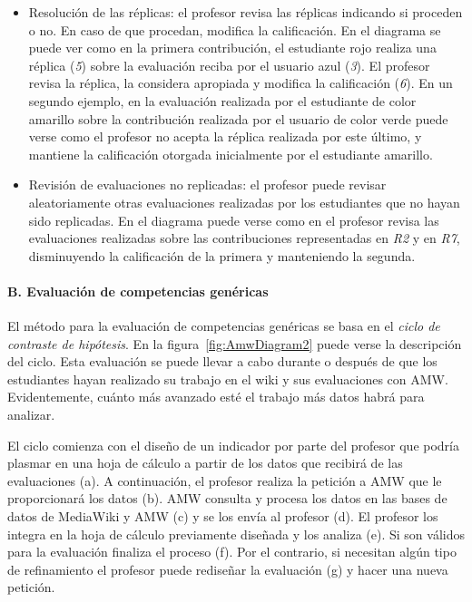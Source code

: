 			\begin{itemize}
				\item Resolución de las réplicas: el profesor revisa las réplicas indicando si proceden o no. En caso de que procedan, modifica la calificación. En el diagrama se puede ver como en la primera contribución, el estudiante rojo realiza una réplica (\emph{5}) sobre la evaluación reciba por el usuario azul (\emph{3}). El profesor revisa la réplica, la considera apropiada y modifica la calificación (\emph{6}). En un segundo ejemplo, en la evaluación realizada por el estudiante de color amarillo sobre la contribución realizada por el usuario de color verde puede verse como el profesor no acepta la réplica realizada por este último, y mantiene la calificación otorgada inicialmente por el estudiante amarillo.
				\item Revisión de evaluaciones no replicadas: el profesor puede revisar aleatoriamente otras evaluaciones realizadas por los estudiantes que no hayan sido replicadas. En el diagrama puede verse como en el profesor revisa las evaluaciones realizadas sobre las contribuciones representadas en \emph{R2} y en \emph{R7}, disminuyendo la calificación de la primera y manteniendo la segunda.
			\end{itemize}

			\paragraph*{B. Evaluación de competencias genéricas}

			El método para la evaluación de competencias genéricas se basa en el \emph{ciclo de contraste de hipótesis}. En la figura~\ref{fig:AmwDiagram2} puede verse la descripción del ciclo. Esta evaluación se puede llevar a cabo durante o después de que los estudiantes hayan realizado su trabajo en el wiki y sus evaluaciones con AMW. Evidentemente, cuánto más avanzado esté el trabajo más datos habrá para analizar. 

			El ciclo comienza con el diseño de un indicador por parte del profesor que podría plasmar en una hoja de cálculo a partir de los datos que recibirá de las evaluaciones (a). A continuación, el profesor realiza la petición a AMW que le proporcionará los datos (b). AMW consulta y procesa los datos en las bases de datos de MediaWiki y AMW (c) y se los envía al profesor (d). El profesor los integra en la hoja de cálculo previamente diseñada y los analiza (e). Si son válidos para la evaluación finaliza el proceso (f). Por el contrario, si necesitan algún tipo de refinamiento el profesor puede rediseñar la evaluación (g) y hacer una nueva petición.

